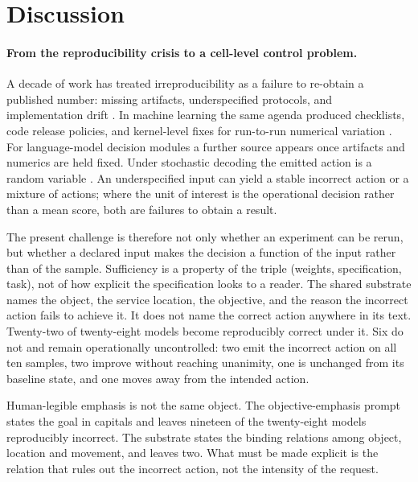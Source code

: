 \section{Discussion}
\label{sec:discussion}

\paragraph{From the reproducibility crisis to a cell-level control problem.}
A decade of work has treated irreproducibility as a failure to re-obtain a published
number: missing artifacts, underspecified protocols, and implementation drift
\citep{baker2016reproducibility,gundersen2018state,pineau2021improving}. In machine
learning the same agenda produced checklists, code release policies, and
kernel-level fixes for run-to-run numerical variation
\citep{pineau2021improving,he2025nondeterminism}. For language-model decision
modules a further source appears once artifacts and numerics are held fixed. Under
stochastic decoding the emitted action is a random variable
\citep{Ouyang_2025,atil2025nondeterminismdeterministicllmsettings}. An
underspecified input can yield a stable incorrect action or a mixture of actions;
where the unit of interest is the operational decision rather than a mean score,
both are failures to obtain a result.

The present challenge is therefore not only whether an experiment can be rerun, but
whether a declared input makes the decision a function of the input rather than of
the sample. Sufficiency is a property of the triple (weights, specification, task),
not of how explicit the specification looks to a reader. The shared substrate
names the object, the service location, the objective, and the reason the incorrect
action fails to achieve it. It does not name the correct action anywhere in its
text. Twenty-two of twenty-eight models become reproducibly correct under it. Six do
not and remain operationally uncontrolled: two emit the incorrect action on all ten
samples, two improve without reaching unanimity, one is unchanged from its baseline
state, and one moves away from the intended action.

Human-legible emphasis is not the same object. The objective-emphasis prompt states
the goal in capitals and leaves nineteen of the twenty-eight models reproducibly
incorrect. The substrate states the binding relations among object, location and
movement, and leaves two. What must be made explicit is the relation that rules out
the incorrect action, not the intensity of the request.

